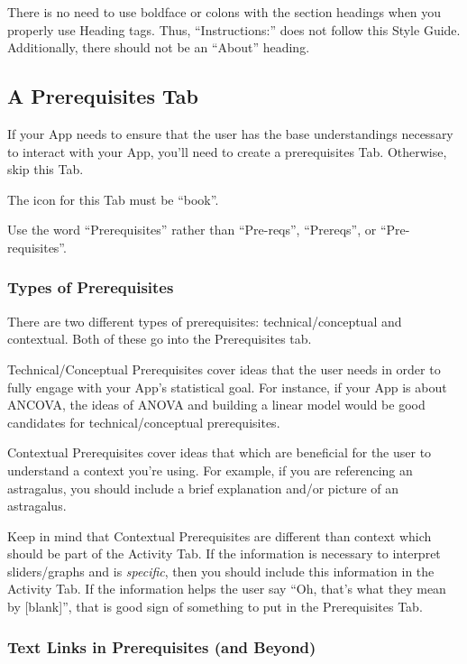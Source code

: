 \documentclass[
]{book}
\begin{document}
There is no need to use boldface or colons with the section headings when you properly use Heading tags. Thus, ``Instructions:'' does not follow this Style Guide. Additionally, there should not be an ``About'' heading.

\hypertarget{a-prerequisites-tab}{%
\subsection{A Prerequisites Tab}\label{a-prerequisites-tab}}

If your App needs to ensure that the user has the base understandings necessary to interact with your App, you'll need to create a prerequisites Tab. Otherwise, skip this Tab.

The icon for this Tab must be ``book''.

Use the word ``Prerequisites'' rather than ``Pre-reqs'', ``Prereqs'', or ``Pre-requisites''.

\hypertarget{types-of-prerequisites}{%
\subsubsection{Types of Prerequisites}\label{types-of-prerequisites}}

There are two different types of prerequisites: technical/conceptual and contextual. Both of these go into the Prerequisites tab.

Technical/Conceptual Prerequisites cover ideas that the user needs in order to fully engage with your App's statistical goal. For instance, if your App is about ANCOVA, the ideas of ANOVA and building a linear model would be good candidates for technical/conceptual prerequisites.

Contextual Prerequisites cover ideas that which are beneficial for the user to understand a context you're using. For example, if you are referencing an astragalus, you should include a brief explanation and/or picture of an astragalus.

Keep in mind that Contextual Prerequisites are different than context which should be part of the Activity Tab. If the information is necessary to interpret sliders/graphs and is \emph{specific}, then you should include this information in the Activity Tab. If the information helps the user say ``Oh, that's what they mean by {[}blank{]}'', that is good sign of something to put in the Prerequisites Tab.

\hypertarget{text-links-in-prerequisites-and-beyond}{%
\subsubsection{Text Links in Prerequisites (and Beyond)}\label{text-links-in-prerequisites-and-beyond}}
\end{document}
